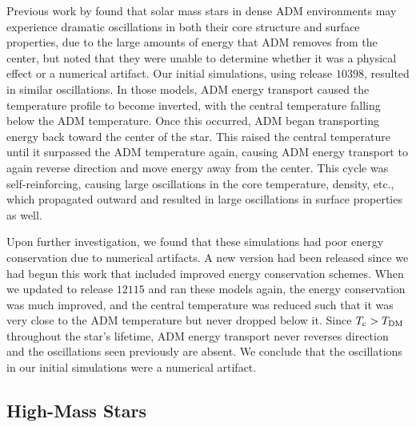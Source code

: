 \documentclass[useAMS,usenatbib]{mnras}
\begin{document}
Previous work by \cite{Iocco+12} found that solar mass stars 
in dense ADM environments may experience dramatic oscillations 
in both their core structure and surface properties, 
due to the large amounts of energy that ADM removes from the center, 
but noted that they were unable to determine whether it was 
a physical effect or a numerical artifact. Our initial simulations, 
using \mesa release $10398$, resulted in similar oscillations. In those models, 
ADM energy transport caused the temperature profile 
to become inverted, with the central temperature falling below the ADM temperature. 
Once this occurred, ADM began transporting energy back toward the center of the star. 
This raised the central temperature until it surpassed the ADM temperature again, 
causing ADM energy transport to again reverse direction and move energy away from the center. 
This cycle was self-reinforcing, causing large oscillations in the core temperature, 
density, etc., which propagated outward and resulted in large 
oscillations in surface properties as well.


Upon further investigation, 
we found that these simulations had poor energy conservation 
due to numerical artifacts. 
A new \mesa version had been released since we had begun 
this work that included improved energy conservation schemes. 
When we updated to \mesa release $12115$ and ran these models again, 
the energy conservation was much improved, 
and the central temperature was reduced such that 
it was very close to the ADM temperature but never 
dropped below it. Since $T_\mathrm{c} > T_{\mathrm{DM}}$ throughout the star's lifetime, 
ADM energy transport never reverses direction and the oscillations 
seen previously are absent. We conclude that the oscillations in our initial simulations
were a numerical artifact.


\subsection{High-Mass Stars}
\label{sub:highmass}
\end{document}
